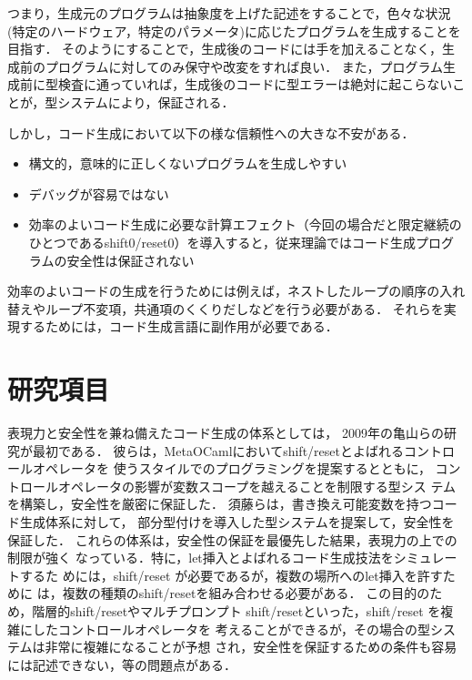 \documentclass[10pt,a4j,twocolumn]{jarticle}
\theoremstyle{definition}
\begin{document}
つまり，生成元のプログラムは抽象度を上げた記述をすることで，色々な状況(特定のハードウェア，特定のパラメータ)に応じたプログラムを生成することを目指す．
そのようにすることで，生成後のコードには手を加えることなく，生成前のプログラムに対してのみ保守や改変をすれば良い．
また，プログラム生成前に型検査に通っていれば，生成後のコードに型エラーは絶対に起こらないことが，型システムにより，保証される．

しかし，コード生成において以下の様な信頼性への大きな不安がある．

\begin{itemize}
\item 構文的，意味的に正しくないプログラムを生成しやすい
\item デバッグが容易ではない
\item 効率のよいコード生成に必要な計算エフェクト（今回の場合だと限定継続のひとつであるshift0/reset0）を導入すると，従来理論ではコード生成プログラムの安全性は保証されない
\end{itemize}

効率のよいコードの生成を行うためには例えば，ネストしたループの順序の入れ替えやループ不変項，共通項のくくりだしなどを行う必要がある．
それらを実現するためには，コード生成言語に副作用が必要である．

\section{研究項目}
表現力と安全性を兼ね備えたコード生成の体系としては，
2009年の亀山らの研究\cite{Kameyama2009}が最初である．
彼らは，MetaOCamlにおいてshift/resetとよばれるコントロールオペレータを
使うスタイルでのプログラミングを提案するとともに，
コントロールオペレータの影響が変数スコープを越えることを制限する型シス
テムを構築し，安全性を厳密に保証した．
須藤ら\cite{Sudo2014}は，書き換え可能変数を持つコード生成体系に対して，
部分型付けを導入した型システムを提案して，安全性を保証した．
これらの体系は，安全性の保証を最優先した結果，表現力の上での制限が強く
なっている．特に，let挿入とよばれるコード生成技法をシミュレートするた
めには，shift/reset が必要であるが，複数の場所へのlet挿入を許すために
は，複数の種類のshift/resetを組み合わせる必要がある．
この目的のため，階層的shift/resetやマルチプロンプト
shift/resetといった，shift/reset を複雑にしたコントロールオペレータを
考えることができるが，その場合の型システムは非常に複雑になることが予想
され，安全性を保証するための条件も容易には記述できない，等の問題点がある．
\end{document}
